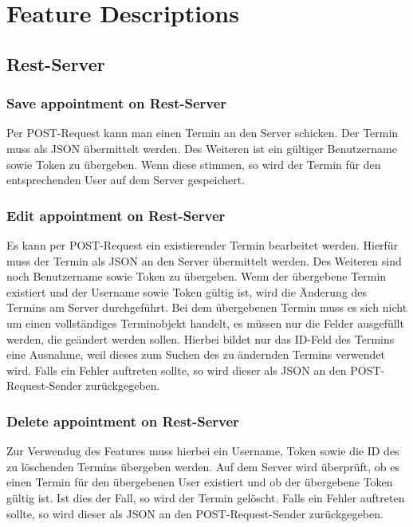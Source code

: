 \documentclass[12pt]{scrartcl}
\begin{document}
    \section{Feature Descriptions}
    \subsection{Rest-Server}
    \subsubsection{Save appointment on Rest-Server}
        Per POST-Request kann man einen Termin an den Server schicken.
        Der Termin muss als JSON übermittelt werden. Des Weiteren ist ein gültiger Benutzername sowie Token zu übergeben.
        Wenn diese stimmen, so wird der Termin für den entsprechenden User auf dem Server gespeichert.
    
    \subsubsection{Edit appointment on Rest-Server}
        Es kann per POST-Request ein existierender Termin bearbeitet werden. Hierfür muss der Termin als JSON an den Server übermittelt werden.
        Des Weiteren sind noch Benutzername sowie Token zu übergeben. Wenn der übergebene Termin existiert und der Username sowie Token gültig ist, 
        wird die Änderung des Termins am Server durchgeführt. Bei dem übergebenen Termin muss es sich nicht um einen vollständiges Terminobjekt handelt, es 
        müssen nur die Felder ausgefüllt werden, die geändert werden sollen. Hierbei bildet nur das ID-Feld des Termins eine Ausnahme, weil dieses zum Suchen 
        des zu ändernden Termins verwendet wird.
        Falls ein Fehler auftreten sollte, so wird dieser als JSON an den POST-Request-Sender zurückgegeben.

    \subsubsection{Delete appointment on Rest-Server}
        Zur Verwendug des Features muss hierbei ein Username, Token sowie die ID des zu löschenden Termins übergeben werden.
        Auf dem Server wird überprüft, ob es einen Termin für den übergebenen User existiert und ob der übergebene Token gültig ist.
        Ist dies der Fall, so wird der Termin gelöscht.
        Falls ein Fehler auftreten sollte, so wird dieser als JSON an den POST-Request-Sender zurückgegeben.
    
\end{document}
